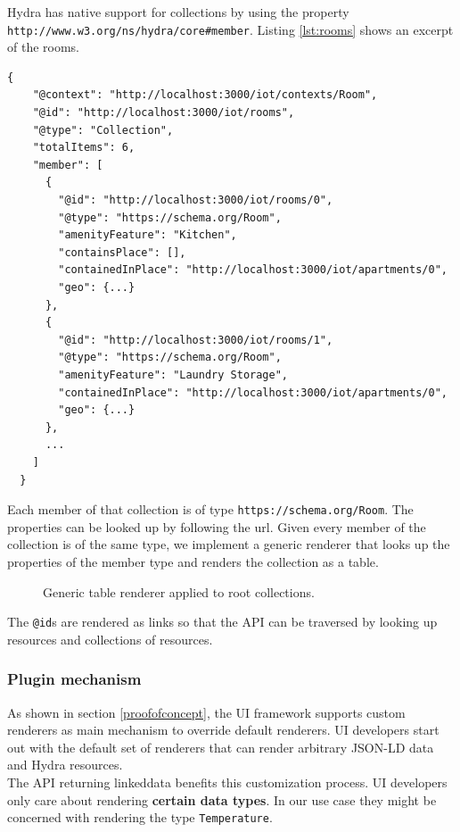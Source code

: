Hydra has native support for collections by using the property \lstinline{http://www.w3.org/ns/hydra/core#member}. Listing \ref{lst:rooms} shows an excerpt of the rooms.

\lstset{language=JSON}
\begin{lstlisting}[caption=Data of /rooms as Hydra collection., label=lst:rooms]
  {
    "@context": "http://localhost:3000/iot/contexts/Room",
    "@id": "http://localhost:3000/iot/rooms",
    "@type": "Collection",
    "totalItems": 6,
    "member": [
      {
        "@id": "http://localhost:3000/iot/rooms/0",
        "@type": "https://schema.org/Room",
        "amenityFeature": "Kitchen",
        "containsPlace": [],
        "containedInPlace": "http://localhost:3000/iot/apartments/0",
        "geo": {...}
      },
      {
        "@id": "http://localhost:3000/iot/rooms/1",
        "@type": "https://schema.org/Room",
        "amenityFeature": "Laundry Storage",
        "containedInPlace": "http://localhost:3000/iot/apartments/0",
        "geo": {...}
      },
      ...
    ]
  }
\end{lstlisting}

Each member of that collection is of type \lstinline{https://schema.org/Room}. The properties can be looked up by following the \gls{url}. Given every member of the collection is of the same type, we implement a generic renderer that looks up the properties of the member type and renders the collection as a table.

\begin{figure}[!htb]
  \caption{Generic table renderer applied to root collections.}
\end{figure}

The \lstinline{@id}s are rendered as links so that the API can be traversed by looking up resources and collections of resources.

\subsubsection{Plugin mechanism}\label{pluginmechanism}
As shown in section \ref{proofofconcept}, the UI framework supports custom renderers as main mechanism to override default renderers. UI developers start out with the default set of renderers that can render arbitrary JSON-LD data and Hydra resources. \\
The API returning \gls{linkeddata} benefits this customization process. UI developers only care about rendering \textbf{certain data types}. In our use case they might be concerned with rendering the type \lstinline{Temperature}.

